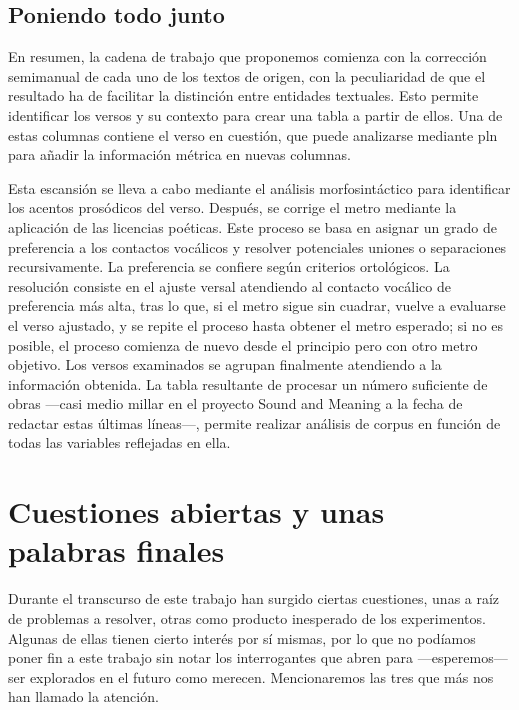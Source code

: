 \subsection{Poniendo todo junto}
En resumen, la cadena de trabajo que proponemos comienza con la corrección semimanual de cada uno de los textos de origen, con la peculiaridad de que el resultado ha de facilitar la distinción entre entidades textuales. Esto permite identificar los versos y su contexto para crear una tabla a partir de ellos. Una de estas columnas contiene el verso en cuestión, que puede analizarse mediante \ac{pln} para añadir la información métrica en nuevas columnas.

Esta escansión se lleva a cabo mediante el análisis morfosintáctico para identificar los acentos prosódicos del verso. Después, se corrige el metro mediante la aplicación de las licencias poéticas. Este proceso se basa en asignar un grado de preferencia a los contactos vocálicos y resolver potenciales uniones o separaciones recursivamente. La preferencia se confiere según criterios ortológicos. La resolución consiste en el ajuste versal atendiendo al contacto vocálico de preferencia más alta, tras lo que, si el metro sigue sin cuadrar, vuelve a evaluarse el verso ajustado, y se repite el proceso hasta obtener el metro esperado; si no es posible, el proceso comienza de nuevo desde el principio pero con otro metro objetivo. Los versos examinados se agrupan finalmente atendiendo a la información obtenida. La tabla resultante de procesar un número suficiente de obras —casi medio millar en el proyecto Sound and Meaning a la fecha de redactar estas últimas líneas—, permite realizar análisis de corpus en función de todas las variables reflejadas en ella.

\section{Cuestiones abiertas y unas palabras finales}
Durante el transcurso de este trabajo han surgido ciertas cuestiones, unas a raíz de problemas a resolver, otras como producto inesperado de los experimentos. Algunas de ellas tienen cierto interés por sí mismas, por lo que no podíamos poner fin a este trabajo sin notar los interrogantes que abren para —esperemos— ser explorados en  el futuro como merecen. Mencionaremos las tres que más nos han llamado la atención.

